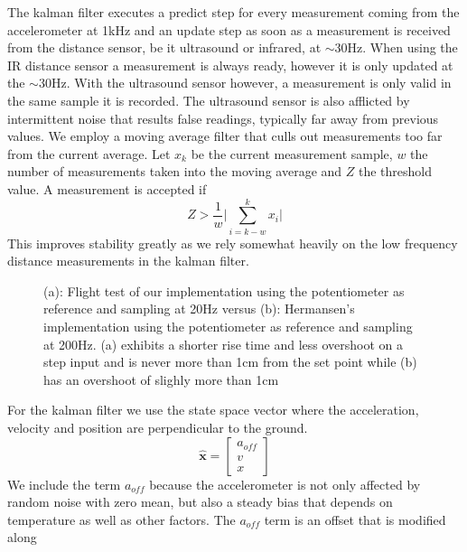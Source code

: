 The kalman filter executes a predict step for every measurement coming from the accelerometer at 1kHz and an update step as soon 
as a measurement is received from the distance sensor, be it ultrasound or infrared, at \(\sim\)30Hz. When using the IR distance 
sensor a measurement is always ready, however it is only updated at the \(\sim\)30Hz. With the ultrasound sensor however, a measurement
is only valid in the same sample it is recorded. The ultrasound sensor is also afflicted by intermittent noise that results false readings,
typically far away from previous values. We employ a moving average filter that culls out measurements too far from the current average.
Let \(x_k\) be the current measurement sample, \(w\) the number of measurements taken into the moving average and \(Z\) the threshold value.
A measurement is accepted if 
\begin{equation*}
	Z >\frac{1}{w} \lvert \sum_{i=k-w}^{k}x_i \rvert
\end{equation*}
This improves stability greatly as we rely somewhat heavily on the low frequency distance measurements in the kalman filter.
\begin{figure}
	\centering
	\subfloat[][]{\newlength\figureheight
		\newlength\figurewidth
		\setlength\figureheight{4cm}
		\setlength\figurewidth{7cm}
		
	}
	\subfloat[][]{\setlength\figureheight{4cm}
		\setlength\figurewidth{7cm}
		
	}
	\caption{(a): Flight test of our implementation using the potentiometer as reference and sampling at 20Hz versus (b):
	Hermansen's implementation using the potentiometer as reference and sampling at 200Hz. (a) exhibits a shorter rise time and less
	overshoot on a step input and is never more than 1cm from the set point while (b) has an overshoot of slighly more than 1cm}
	\label{fig:pottest}
\end{figure}
For the kalman filter we use the state space vector where the acceleration, velocity and position are perpendicular to the ground.
\begin{equation*}
	\hat{\mathbf{x}} = \begin{bmatrix}
		a_{off} \\
		v \\
		x
	\end{bmatrix}
\end{equation*}
We include the term \(a_{off}\) because the accelerometer is not only affected by random noise with zero mean, but also a 
steady bias that depends on temperature as well as other factors. The \(a_{off}\) term is an offset that is modified along
